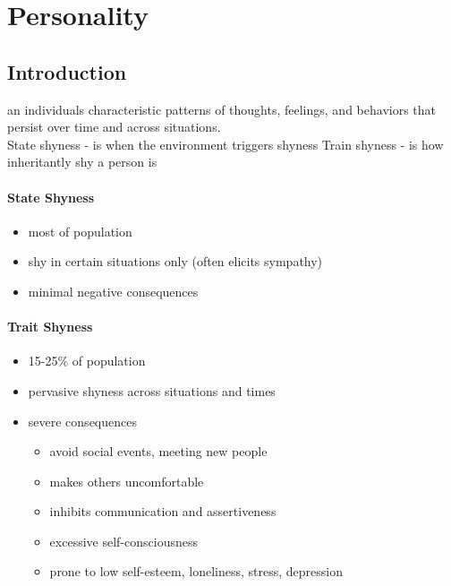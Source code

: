 \documentclass{article}
\begin{document}
\section*{Personality}
\subsection*{Introduction}
an individuals characteristic patterns of thoughts, feelings, and behaviors that persist over time and across situations.\\
State shyness - is when the environment triggers shyness
Train shyness - is how inheritantly shy a person is
\paragraph*{State Shyness} 
\begin{itemize}
\item most of population
\item shy in certain situations only (often elicits sympathy) 
\item minimal negative consequences
\end{itemize}
\paragraph*{Trait Shyness}
\begin{itemize}
\item 15-25\% of population
\item pervasive shyness across situations and times
\item severe consequences
\begin{itemize}
\item avoid social events, meeting new people
\item makes others uncomfortable
\item inhibits communication and assertiveness
\item excessive self-consciousness
\item prone to low self-esteem, loneliness, stress, depression
\end{itemize}
\end{itemize}
\end{document}
